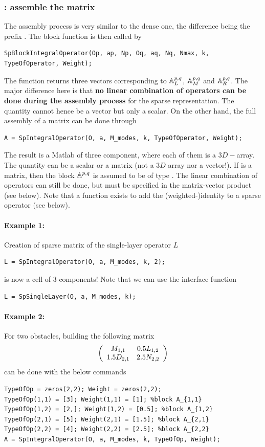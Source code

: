 \subsubsection{\mudiff: assemble the matrix}
\label{secFun:SpBlockIntegralOperator}
\label{secFun:SpIntegralOperator}

The assembly process is very similar to the dense one, the difference being the prefix . The block function is then called by
\begin{lstlisting}
SpBlockIntegralOperator(Op, ap, Np, Oq, aq, Nq, Nmax, k, TypeOfOperator, Weight);
\end{lstlisting}
The function returns three vectors corresponding to ${\mathbb{A}}_L^{p,q}$, ${\mathbb{A}}_M^{p,q}$ and ${\mathbb{A}}_R^{p,q}$. The major difference here is that \textbf{no linear combination of operators can be done during the assembly process} for the sparse representation. The quantity  cannot hence be a vector but only a scalar. On the other hand, the full assembly of a matrix can be done through
\begin{lstlisting}
A = SpIntegralOperator(O, a, M_modes, k, TypeOfOperator, Weight);
\end{lstlisting}
The result is a Matlab  of three component, where each of them is a $3D-$array. The quantity  can be a scalar or a matrix (not a $3D$ array nor a vector!). If  is a matrix, then the block $\mathbb{A}^{p,q}$ is assumed to be of type . The linear combination of operators can still be done, but must be specified in the matrix-vector product (see below). Note that a function exists to add the (weighted-)identity to a sparse operator (see below).

\paragraph{Example 1:} Creation of \mudiff sparse matrix of the single-layer operator $L$
\begin{lstlisting}
L = SpIntegralOperator(O, a, M_modes, k, 2);
\end{lstlisting}
 is now a cell of $3$ components! Note that we can use the interface function
\begin{lstlisting}
L = SpSingleLayer(O, a, M_modes, k);
\end{lstlisting}
\paragraph{Example 2:} For two obstacles, building the following matrix 
$$
\left(\begin{array}{c c}
M_{1,1} & 0.5L_{1,2}\\
1.5D_{2,1} & 2.5N_{2,2}
\end{array}\right)
$$
can be done with the below commands
\begin{lstlisting}
TypeOfOp = zeros(2,2); Weight = zeros(2,2);
TypeOfOp(1,1) = [3]; Weight(1,1) = [1]; %block A_{1,1}
TypeOfOp(1,2) = [2,]; Weight(1,2) = [0.5]; %block A_{1,2}
TypeOfOp(2,1) = [5]; Weight(2,1) = [1.5]; %block A_{2,1}
TypeOfOp(2,2) = [4]; Weight(2,2) = [2.5]; %block A_{2,2}
A = SpIntegralOperator(O, a, M_modes, k, TypeOfOp, Weight);
\end{lstlisting}

